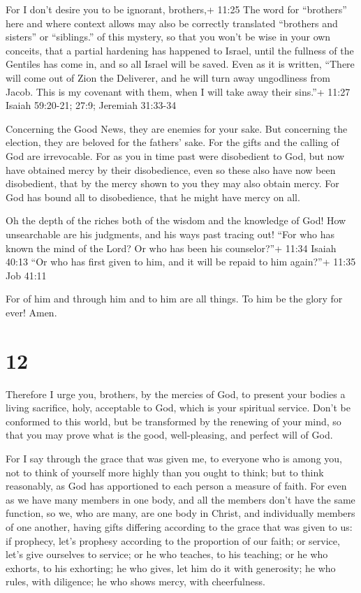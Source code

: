  For I don't desire you to be ignorant, brothers,+ 11:25
The word for ``brothers'' here and where context allows may also be
correctly translated ``brothers and sisters'' or ``siblings.'' of this
mystery, so that you won't be wise in your own conceits, that a partial
hardening has happened to Israel, until the fullness of the Gentiles has
come in,  and so all Israel will be saved. Even as it is
written, ``There will come out of Zion the Deliverer, and he will turn
away ungodliness from Jacob.  This is my covenant with
them, when I will take away their sins.''+ 11:27 Isaiah 59:20-21; 27:9;
Jeremiah 31:33-34

 Concerning the Good News, they are enemies for your sake.
But concerning the election, they are beloved for the fathers' sake.
 For the gifts and the calling of God are irrevocable.
 For as you in time past were disobedient to God, but now
have obtained mercy by their disobedience,  even so these
also have now been disobedient, that by the mercy shown to you they may
also obtain mercy.  For God has bound all to disobedience,
that he might have mercy on all.

 Oh the depth of the riches both of the wisdom and the
knowledge of God! How unsearchable are his judgments, and his ways past
tracing out!  ``For who has known the mind of the Lord? Or
who has been his counselor?''+ 11:34 Isaiah 40:13  ``Or who
has first given to him, and it will be repaid to him again?''+ 11:35 Job
41:11

 For of him and through him and to him are all things. To
him be the glory for ever! Amen.

\hypertarget{section-11}{%
\section{12}\label{section-11}}

 Therefore I urge you, brothers, by the mercies of God, to
present your bodies a living sacrifice, holy, acceptable to God, which
is your spiritual service.  Don't be conformed to this
world, but be transformed by the renewing of your mind, so that you may
prove what is the good, well-pleasing, and perfect will of God.

 For I say through the grace that was given me, to everyone
who is among you, not to think of yourself more highly than you ought to
think; but to think reasonably, as God has apportioned to each person a
measure of faith.  For even as we have many members in one
body, and all the members don't have the same function,  so
we, who are many, are one body in Christ, and individually members of
one another,  having gifts differing according to the grace
that was given to us: if prophecy, let's prophesy according to the
proportion of our faith;  or service, let's give ourselves
to service; or he who teaches, to his teaching;  or he who
exhorts, to his exhorting; he who gives, let him do it with generosity;
he who rules, with diligence; he who shows mercy, with cheerfulness.


